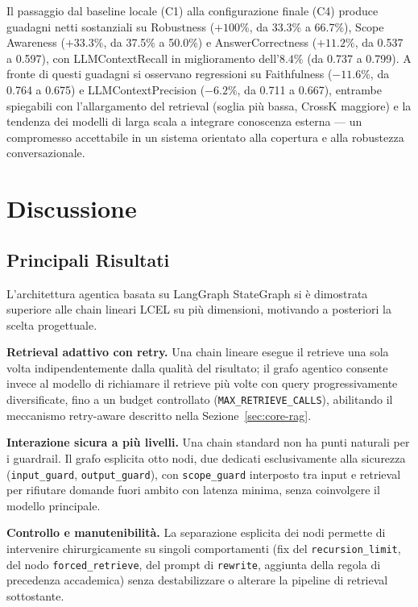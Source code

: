 \documentclass[11pt,a4paper]{article}
\begin{document}
Il passaggio dal baseline locale (C1) alla configurazione finale (C4) produce
guadagni netti sostanziali su Robustness ($+100\%$, da 33.3\% a 66.7\%),
Scope Awareness ($+33.3\%$, da 37.5\% a 50.0\%) e AnswerCorrectness ($+11.2\%$,
da 0.537 a 0.597), con LLMContextRecall in miglioramento dell'$8.4\%$ (da 0.737
a 0.799). A fronte di questi guadagni si osservano regressioni su Faithfulness
($-11.6\%$, da 0.764 a 0.675) e LLMContextPrecision ($-6.2\%$, da 0.711 a 0.667),
entrambe spiegabili con l'allargamento del retrieval (soglia più bassa, CrossK
maggiore) e la tendenza dei modelli di larga scala a integrare conoscenza esterna ---
un compromesso accettabile in un sistema orientato alla copertura e alla robustezza
conversazionale.

\section{Discussione}
\label{sec:discussion}

\subsection{Principali Risultati}

L'architettura agentica basata su LangGraph StateGraph si è dimostrata superiore alle
chain lineari LCEL su più dimensioni, motivando a posteriori la scelta progettuale.

\textbf{Retrieval adattivo con retry.} Una chain lineare esegue il retrieve una sola
volta indipendentemente dalla qualità del risultato; il grafo agentico consente invece
al modello di richiamare il retrieve più volte con query progressivamente diversificate,
fino a un budget controllato (\texttt{MAX\_RETRIEVE\_CALLS}), abilitando il meccanismo
retry-aware descritto nella Sezione~\ref{sec:core-rag}.

\textbf{Interazione sicura a più livelli.} Una chain standard non ha punti naturali per
i guardrail. Il grafo esplicita otto nodi, due dedicati esclusivamente alla sicurezza
(\texttt{input\_guard}, \texttt{output\_guard}), con \texttt{scope\_guard} interposto tra
input e retrieval per rifiutare domande fuori ambito con latenza minima, senza
coinvolgere il modello principale.

\textbf{Controllo e manutenibilità.} La separazione esplicita dei nodi permette di
intervenire chirurgicamente su singoli comportamenti (fix del \texttt{recursion\_limit},
del nodo \texttt{forced\_retrieve}, del prompt di \texttt{rewrite}, aggiunta della regola
di precedenza accademica) senza destabilizzare o alterare la pipeline di retrieval
sottostante.
\end{document}
